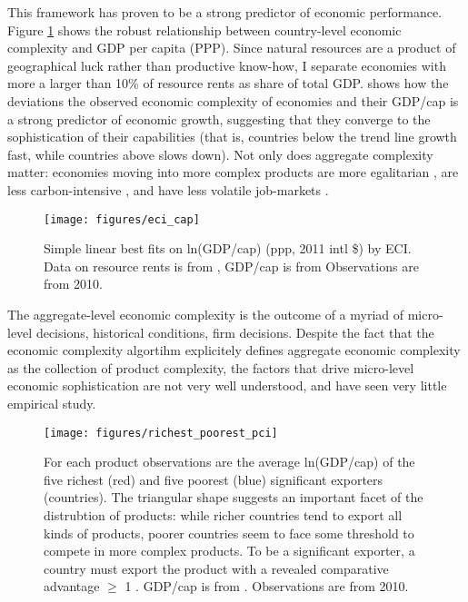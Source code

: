 \documentclass[11pt]{article}
\begin{document}
This framework has proven to be a strong predictor of economic performance. Figure \ref{fig:framework-eci-gdp} shows the robust relationship between country-level economic complexity and GDP per capita (PPP). Since natural resources are a product of geographical luck rather than productive know-how, I separate economies with more a larger than 10\% of resource rents as share of total GDP. \cite{hausmann_atlas_2013} shows how the deviations the observed economic complexity of economies and their GDP/cap is a strong predictor of economic growth, suggesting that they converge to the sophistication of their capabilities (that is, countries below the trend line growth fast, while countries above slows down). Not only does aggregate complexity matter: economies moving into more complex products are more egalitarian \citep{hartmann_linking_2017-1}, are less carbon-intensive \citep{can_impact_2017}, and have less volatile job-markets \citep{adam_economic_2019}.

\begin{figure}[htpb]
	\centering
	\texttt{[image: figures/eci\_cap]}
	\caption[GDP per capita and Economic Complexity]{Simple linear best fits on ln(GDP/cap) (ppp, 2011 intl \$) by ECI. Data on resource rents is from \cite{world_bank_world_2020}, GDP/cap is from \cite{world_bank_world_2020-1} Observations are from 2010.}
	\label{fig:framework-eci-gdp}
\end{figure}

The aggregate-level economic complexity is the outcome of a myriad of micro-level decisions, historical conditions, firm decisions. Despite the fact that the economic complexity algortihm explicitely defines aggregate economic complexity as the collection of product complexity, the factors that drive micro-level economic sophistication are not very well understood, and have seen very little empirical study.

\begin{figure}[htpb]
	\centering
	\texttt{[image: figures/richest\_poorest\_pci]}
	\caption[Product sophistication by richest and poorest exporters]{For each product observations are the average ln(GDP/cap) of the five richest (red) and five poorest (blue) significant exporters (countries). The triangular shape suggests an important facet of the distrubtion of products: while richer countries tend to export all kinds of products, poorer countries seem to face some threshold to compete in more complex products. To be a significant exporter, a country must export the product with a revealed comparative advantage \(\geq\) 1  \citep{balassa_trade_1965}. GDP/cap is from \cite{world_bank_world_2020-1}. Observations are from 2010.}%
	\label{fig:framework-least-most}
\end{figure}
\end{document}
